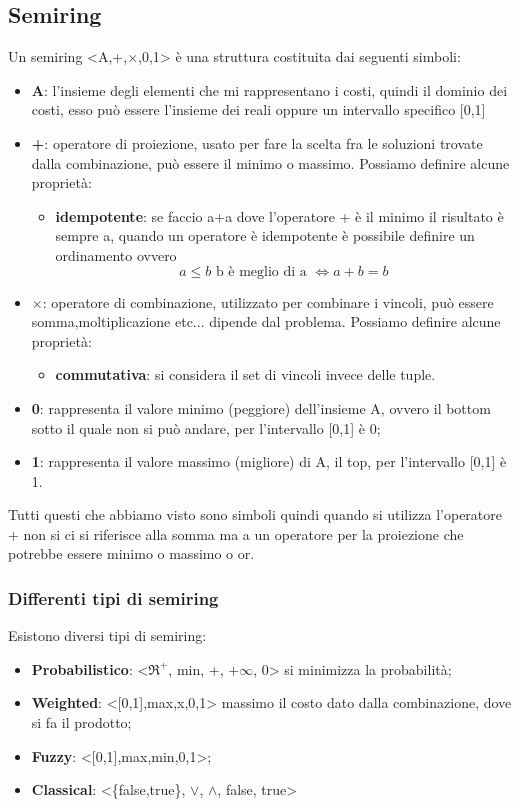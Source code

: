 \subsection{Semiring}
Un semiring <A,+,$\times$,0,1> è una struttura costituita dai seguenti simboli:
\begin{itemize}
    \item \textbf{A}: l'insieme degli elementi che mi rappresentano i costi, quindi il dominio dei costi, esso può essere l'insieme dei reali oppure un intervallo specifico [0,1]
    \item \textbf{+}: operatore di proiezione, usato per fare la scelta fra le soluzioni trovate dalla combinazione, può essere il minimo o massimo. Possiamo definire alcune proprietà:
    \begin{itemize}
        \item \textbf{idempotente}: se faccio a+a dove l'operatore + è il minimo il risultato è sempre a, quando un operatore è idempotente è possibile definire un ordinamento ovvero 
        \[ a \leq b \text{ b è meglio di a } \iff a+b=b\]
    \end{itemize}
    \item \textbf{$\times$}: operatore di combinazione, utilizzato per combinare i vincoli, può essere somma,moltiplicazione etc... dipende dal problema. Possiamo definire alcune proprietà:
    \begin{itemize}
        \item \textbf{commutativa}: si considera il set di vincoli invece delle tuple.
    \end{itemize}
    \item \textbf{0}: rappresenta il valore minimo (peggiore) dell'insieme A, ovvero il bottom sotto il quale non si può andare, per l'intervallo [0,1] è 0;
    \item \textbf{1}: rappresenta il valore massimo (migliore) di A, il top, per l'intervallo [0,1] è 1. 
\end{itemize}
Tutti questi che abbiamo visto sono simboli quindi quando si utilizza l'operatore + non si ci si riferisce alla somma ma a un operatore per la proiezione che potrebbe essere minimo o massimo o or.

\subsubsection{Differenti tipi di semiring}
Esistono diversi tipi di semiring:
\begin{itemize}
    \item \textbf{Probabilistico}: <$\Re^+$, min, +, $+\infty$, 0> si minimizza la probabilità;
    \item \textbf{Weighted}: <[0,1],max,x,0,1> massimo il costo dato dalla combinazione, dove si fa il prodotto;
    \item \textbf{Fuzzy}: <[0,1],max,min,0,1>;
    \item \textbf{Classical}: <\{false,true\}, $\vee$, $ \wedge$, false, true>
\end{itemize}

